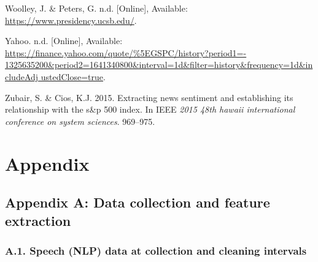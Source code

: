 \documentclass[11pt,preprint, authoryear]{elsarticle}
\numberwithin{equation}{section}
\numberwithin{figure}{section}
\numberwithin{table}{section}
\newlength{\cslhangindent}
\newenvironment{CSLReferences}%
  {\setlength{\parindent}{0pt}%
  \everypar{\setlength{\hangindent}{\cslhangindent}}\ignorespaces}%
  {\par}
\begin{document}
\begin{CSLReferences}{1}{0}
\leavevmode{}%
Woolley, J. \& Peters, G. n.d. {[}Online{]}, Available:
\url{https://www.presidency.ucsb.edu/}.

\leavevmode{}%
Yahoo. n.d. {[}Online{]}, Available:
\href{https://finance.yahoo.com/quote/\%5EGSPC/history?period1=-\%201325635200\&period2=1641340800\&interval=1d\&filter=history\&frequency=1d\&includeAdj\%20ustedClose=true}{https://finance.yahoo.com/quote/\%5EGSPC/history?period1=-
1325635200\&period2=1641340800\&interval=1d\&filter=history\&frequency=1d\&includeAdj
ustedClose=true}.

\leavevmode{}%
Zubair, S. \& Cios, K.J. 2015. Extracting news sentiment and
establishing its relationship with the s\&p 500 index. In IEEE
\emph{2015 48th hawaii international conference on system sciences}.
969--975.

\end{CSLReferences}

\newpage

\hypertarget{appendix}{%
\section*{Appendix}\label{appendix}}

\hypertarget{appendix-a-data-collection-and-feature-extraction}{%
\subsection*{Appendix A: Data collection and feature
extraction}\label{appendix-a-data-collection-and-feature-extraction}}

\hypertarget{a.1.-speech-nlp-data-at-collection-and-cleaning-intervals}{%
\subsubsection*{A.1. Speech (NLP) data at collection and cleaning
intervals}\label{a.1.-speech-nlp-data-at-collection-and-cleaning-intervals}}
\end{document}
